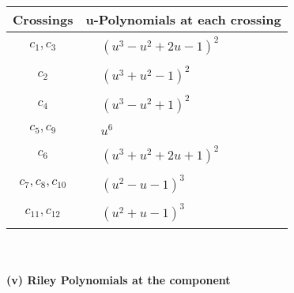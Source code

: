 \documentclass[1p]{elsarticle_modified}
\theoremstyle{definition}
\begin{document}
\begin{tabular}{m{50pt}|m{274pt}}
Crossings & \hspace{64pt}u-Polynomials at each crossing \\
\hline $$\begin{aligned}c_{1},c_{3}\end{aligned}$$&$\begin{aligned}
&(u^3- u^2+2 u-1)^2
\end{aligned}$\\
\hline $$\begin{aligned}c_{2}\end{aligned}$$&$\begin{aligned}
&(u^3+u^2-1)^2
\end{aligned}$\\
\hline $$\begin{aligned}c_{4}\end{aligned}$$&$\begin{aligned}
&(u^3- u^2+1)^2
\end{aligned}$\\
\hline $$\begin{aligned}c_{5},c_{9}\end{aligned}$$&$\begin{aligned}
&u^6
\end{aligned}$\\
\hline $$\begin{aligned}c_{6}\end{aligned}$$&$\begin{aligned}
&(u^3+u^2+2 u+1)^2
\end{aligned}$\\
\hline $$\begin{aligned}c_{7},c_{8},c_{10}\end{aligned}$$&$\begin{aligned}
&(u^2- u-1)^3
\end{aligned}$\\
\hline $$\begin{aligned}c_{11},c_{12}\end{aligned}$$&$\begin{aligned}
&(u^2+u-1)^3
\end{aligned}$\\
\hline
\end{tabular}\\~\\
\newpage\renewcommand{\arraystretch}{1}
\flushleft \textbf{(v) Riley Polynomials at the component}\newline \\
\end{document}
